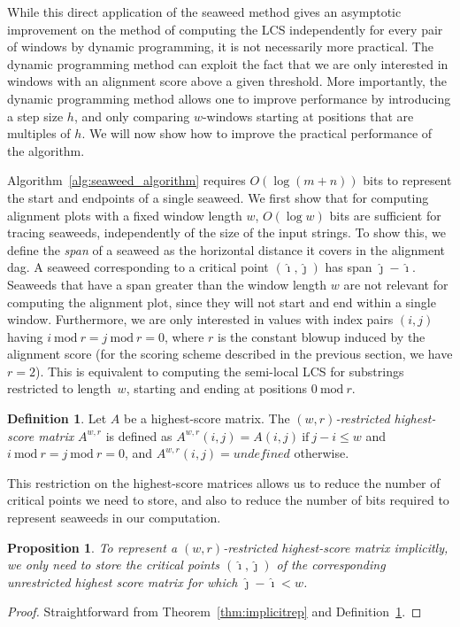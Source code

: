 \documentclass{IOS-Book-Article}     \usepackage{amsmath}
\theoremstyle{plain}
\newtheorem{proposition}[theorem]{Proposition}
\theoremstyle{definition}
\newtheorem{definition}[theorem]{Definition}
\begin{document}
While this direct application of the seaweed method gives an asymptotic improvement
on the method of computing the LCS independently for every pair of windows by dynamic
programming, it is not necessarily more practical. The dynamic programming method
can exploit the fact that we are only interested in windows with an alignment score
above a given threshold. More importantly, the dynamic programming method allows
one to improve performance by introducing a step size $h$, and only comparing
$w$-windows starting at positions that are multiples of $h$. We will now show
how to improve the practical performance of the algorithm.

Algorithm~\ref{alg:seaweed_algorithm} requires $O(\log (m+n))$ bits to
represent the start and endpoints of a single seaweed. We first show 
that for computing alignment plots with a fixed window length $w$, $O(\log w)$ bits are
sufficient for tracing seaweeds, independently of the size of the input strings.
To show this, we define the \textit{span} of a seaweed as the horizontal
distance it covers in the alignment dag. A seaweed corresponding to a critical point
$(\hat{\imath}, \hat{\jmath})$ has span $\hat{\jmath} - \hat{\imath}$. Seaweeds
that have a span greater than the window length $w$ are not relevant for
computing the alignment plot, since they will not start and end within a single
window. Furthermore, we are only interested in values with index pairs $(i,j)$
having $i\ \mathrm{mod}\ r = j\ \mathrm{mod}\ r = 0$, where $r$ is the
constant blowup induced by the alignment score (for the scoring
scheme described in the previous section, we have $r=2$). This is equivalent to
computing the semi-local LCS for substrings restricted to length~$w$, starting and ending 
at positions $0\ \mathrm{mod}\ r$.\begin{definition}\label{def:restricted_hsm}
Let $A$ be a highest-score matrix. 
The \textit{$(w,r)$-restricted highest-score matrix} $A^{w,r}$ is defined as
$A^{w,r}(i,j)= A(i,j) \ \mathrm{if}\ j - i \leq w$ and $i\ \mathrm{mod}\ r = j\
            	\mathrm{mod}\ r = 0$, and  $A^{w,r}(i,j) = \textit{undefined}$ otherwise.
\end{definition}
This restriction on the highest-score matrices allows us to reduce the number of
critical points we need to store, and also to reduce the number of bits required
to represent seaweeds in our computation. 

\begin{proposition}
 To represent a $(w,r)$-restricted highest-score matrix implicitly, we 
 only need to store the
 critical points $(\hat{\imath}, \hat{\jmath})$ of the corresponding unrestricted highest
 score matrix for which $\hat{\jmath}-\hat{\imath} < w$.
\end{proposition}
\begin{proof}
Straightforward from Theorem~\ref{thm:implicitrep} and
Definition~\ref{def:restricted_hsm}.
\end{proof}
\end{document}

